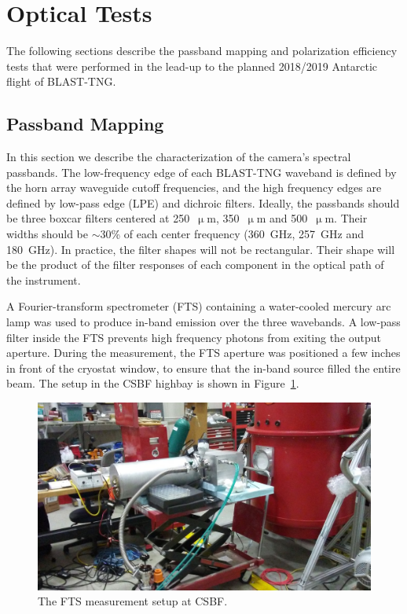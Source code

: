 \section{Optical Tests}\label{optical tests}

The following sections describe the passband mapping and polarization efficiency tests that were performed in the lead-up to the planned 2018/2019 Antarctic flight of BLAST-TNG\@.

\subsection{Passband Mapping}\label{fts}

In this section we describe the characterization of the camera's spectral passbands. The low-frequency edge of each BLAST-TNG waveband is defined by the horn array waveguide cutoff frequencies, and the high frequency edges are defined by low-pass edge (LPE) and dichroic filters. Ideally, the passbands should be three boxcar filters centered at 250~$\upmu$m, 350~$\upmu$m and 500~$\upmu$m. Their widths should be $\sim$30\% of each center frequency (360~GHz, 257~GHz and 180~GHz). In practice, the filter shapes will not be rectangular. Their shape will be the product of the filter responses of each component in the optical path of the instrument.

A Fourier-transform spectrometer (FTS) containing a water-cooled mercury arc lamp was used to produce in-band emission over the three wavebands. A low-pass filter inside the FTS prevents high frequency photons from exiting the output aperture. During the measurement, the FTS aperture was positioned a few inches in front of the cryostat window, to ensure that the in-band source filled the entire beam. The setup in the CSBF highbay is shown in Figure~\ref{fig:fts setup}.

\begin{figure}[!htbp]
\centering
\includegraphics[width=\textwidth]{figures/blast_data/fts/fts_setup}
\caption{The FTS measurement setup at CSBF.}
\label{fig:fts setup}
\end{figure}

